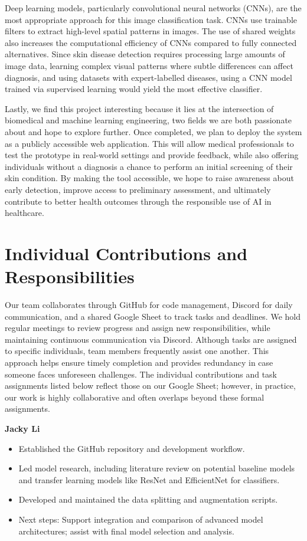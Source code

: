 \documentclass{article} %
\begin{document}
Deep learning models, particularly convolutional neural networks (CNNs), are the most appropriate approach for this image classification task. CNNs use trainable filters to extract high-level spatial patterns in images. The use of shared weights also increases the computational efficiency of CNNs compared to fully connected alternatives. Since skin disease detection requires processing large amounts of image data, learning complex visual patterns where subtle differences can affect diagnosis, and using datasets with expert-labelled diseases, using a CNN model trained via supervised learning would yield the most effective classifier.

Lastly, we find this project interesting because it lies at the intersection of biomedical and machine learning engineering, two fields we are both passionate about and hope to explore further. Once completed, we plan to deploy the system as a publicly accessible web application. This will allow medical professionals to test the prototype in real-world settings and provide feedback, while also offering individuals without a diagnosis a chance to perform an initial screening of their skin condition. By making the tool accessible, we hope to raise awareness about early detection, improve access to preliminary assessment, and ultimately contribute to better health outcomes through the responsible use of AI in healthcare.

\section{Individual Contributions and Responsibilities}

Our team collaborates through GitHub for code management, Discord for daily communication, and a shared Google Sheet to track tasks and deadlines. We hold regular meetings to review progress and assign new responsibilities, while maintaining continuous communication via Discord. Although tasks are assigned to specific individuals, team members frequently assist one another. This approach helps ensure timely completion and provides redundancy in case someone faces unforeseen challenges. The individual contributions and task assignments listed below reflect those on our Google Sheet; however, in practice, our work is highly collaborative and often overlaps beyond these formal assignments.

\textbf{Jacky Li}
\begin{itemize}
\item Established the GitHub repository and development workflow.
\item Led model research, including literature review on potential baseline models and transfer learning models like ResNet and EfficientNet for classifiers.
\item Developed and maintained the data splitting and augmentation scripts.
\item Next steps: Support integration and comparison of advanced model architectures; assist with final model selection and analysis.
\end{itemize}
\end{document}
